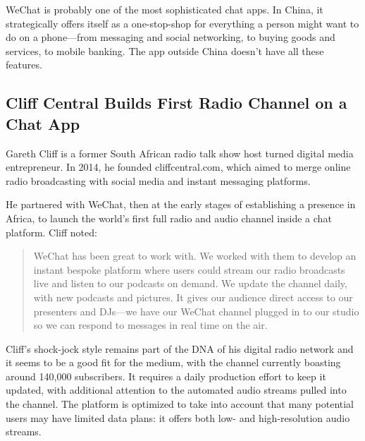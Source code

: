 \documentclass[notoc, symmetric, nobib, nols]{towcenter-guideto-book}
\begin{document}
WeChat is probably one of the most sophisticated chat apps. In China, it strategically offers itself as a one-stop-shop for everything a person might want to do on a phone---from messaging and social networking, to buying goods and services, to mobile banking. The app outside China doesn't have all these features.

\subsection{Cliff Central Builds First Radio Channel on a Chat App}

Gareth Cliff is a former South African radio talk show host turned digital media entrepreneur. In 2014, he founded cliffcentral.com, which aimed to merge online radio broadcasting with social media and instant messaging platforms.\autocite{CNNCliff}

He partnered with WeChat, then at the early stages of establishing a presence in Africa, to launch the world's first full radio and audio channel inside a chat platform. Cliff noted:

\begin{quote}
WeChat has been great to work with. We worked with them to develop an instant bespoke platform where users could stream our radio broadcasts live and listen to our podcasts on demand. We update the channel daily, with new podcasts and pictures. It gives our audience direct access to our presenters and DJs---we have our WeChat channel plugged in to our studio so we can respond to messages in real time on the air.
\end{quote}

Cliff's shock-jock style remains part of the DNA of his digital radio network and it seems to be a good fit for the medium, with the channel currently boasting around 140,000 subscribers. It requires a daily production effort to keep it updated, with additional attention to the automated audio streams pulled into the channel. The platform is optimized to take into account that many potential users may have limited data plans: it offers both low- and high-resolution audio streams.


\end{document}
